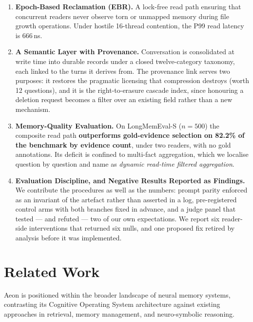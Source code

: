 \documentclass[10pt,twocolumn]{article}
\begin{document}
\begin{enumerate}
    \item \textbf{Epoch-Based Reclamation (EBR).} A lock-free read path ensuring that concurrent readers never observe torn or unmapped memory during file growth operations. Under hostile 16-thread contention, the P99 read latency is 666\,ns.

    \item \textbf{A Semantic Layer with Provenance.} Conversation is consolidated at write time into durable records under a closed twelve-category taxonomy, each linked to the turns it derives from. The provenance link serves two purposes: it restores the pragmatic licensing that compression destroys (worth 12 questions), and it is the right-to-erasure cascade index, since honouring a deletion request becomes a filter over an existing field rather than a new mechanism.

    \item \textbf{Memory-Quality Evaluation.} On LongMemEval-S ($n=500$) the composite read path \textbf{outperforms gold-evidence selection on 82.2\% of the benchmark by evidence count}, under two readers, with no gold annotations. Its deficit is confined to multi-fact aggregation, which we localise question by question and name as \emph{dynamic read-time filtered aggregation}.

    \item \textbf{Evaluation Discipline, and Negative Results Reported as Findings.} We contribute the procedures as well as the numbers: prompt parity enforced as an invariant of the artefact rather than asserted in a log, pre-registered control arms with both branches fixed in advance, and a judge panel that tested --- and refuted --- two of our own expectations. We report six reader-side interventions that returned six nulls, and one proposed fix retired by analysis before it was implemented.
\end{enumerate}

\section{Related Work}
\label{sec:related_work}

Aeon is positioned within the broader landscape of neural memory systems, contrasting its Cognitive Operating System architecture against existing approaches in retrieval, memory management, and neuro-symbolic reasoning.
\end{document}
